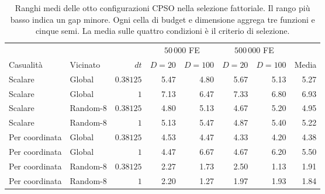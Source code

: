 \begin{table}[htbp]
\centering\small
\caption{Ranghi medi delle otto configurazioni CPSO nella selezione fattoriale. Il rango più basso indica un gap minore. Ogni cella di budget e dimensione aggrega tre funzioni e cinque semi. La media sulle quattro condizioni è il criterio di selezione.}
\label{tab:study3-screen}
\begin{tabular}{@{}llrrrrr r@{}}
\toprule
 & & & \multicolumn{2}{c}{$50\,000$ FE} & \multicolumn{2}{c}{$500\,000$ FE} & \\
\cmidrule(lr){4-5}\cmidrule(lr){6-7}
Casualità & Vicinato & $dt$ & $D=20$ & $D=100$ & $D=20$ & $D=100$ & Media \\
\midrule
Scalare & Global & $0.38125$ & 5.47 & 4.80 & 5.67 & 5.13 & 5.27 \\
Scalare & Global & $1$ & 7.13 & 6.47 & 7.33 & 6.80 & 6.93 \\
Scalare & Random-8 & $0.38125$ & 4.80 & 5.13 & 4.67 & 5.20 & 4.95 \\
Scalare & Random-8 & $1$ & 5.13 & 5.47 & 4.87 & 5.40 & 5.22 \\
\addlinespace
Per coordinata & Global & $0.38125$ & 4.53 & 4.47 & 4.33 & 4.20 & 4.38 \\
Per coordinata & Global & $1$ & 4.47 & 6.67 & 4.67 & 6.20 & 5.50 \\
Per coordinata & Random-8 & $0.38125$ & 2.27 & 1.73 & 2.50 & 1.13 & 1.91 \\
Per coordinata & Random-8 & $1$ & 2.20 & 1.27 & 1.97 & 1.93 & 1.84 \\
\bottomrule
\end{tabular}
\end{table}
